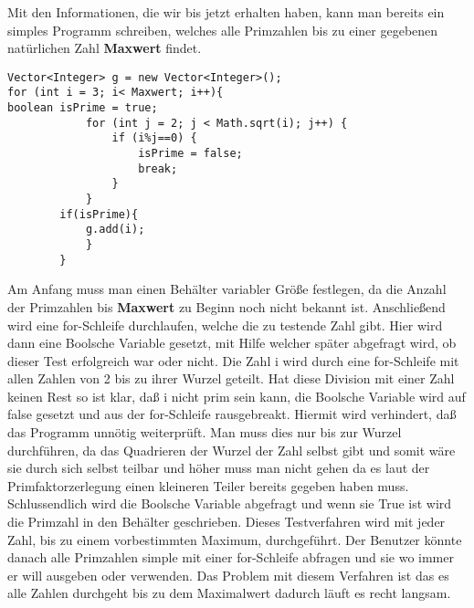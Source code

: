 Mit den Informationen, die wir bis jetzt erhalten haben, kann man bereits ein simples Programm schreiben, welches alle Primzahlen bis zu einer gegebenen natürlichen Zahl \textbf{Maxwert} findet.
\lstset{language=Java} 
\begin{lstlisting}[frame=single] 
Vector<Integer> g = new Vector<Integer>();
for (int i = 3; i< Maxwert; i++){
boolean isPrime = true;
			for (int j = 2; j < Math.sqrt(i); j++) {
				if (i%j==0) {
					isPrime = false;
					break;
				}
			}
		if(isPrime){
			g.add(i);
			}	
		}
\end{lstlisting}
Am Anfang muss man einen Behälter variabler Größe festlegen, da die Anzahl der Primzahlen bis \textbf{Maxwert} zu Beginn noch nicht bekannt ist. Anschließend wird eine for-Schleife durchlaufen, welche die zu testende Zahl gibt. Hier wird dann eine Boolsche Variable gesetzt, mit Hilfe welcher später abgefragt wird, ob dieser Test erfolgreich war oder nicht. Die Zahl i wird durch eine for-Schleife mit allen Zahlen von 2 bis zu ihrer Wurzel geteilt. Hat diese Division mit einer Zahl keinen Rest so ist klar, daß i nicht prim sein kann, die Boolsche Variable wird auf false gesetzt und aus der for-Schleife rausgebreakt. Hiermit wird verhindert, daß das Programm unnötig weiterprüft. Man muss dies nur bis zur Wurzel durchführen, da das Quadrieren der Wurzel der Zahl selbst gibt und somit wäre sie durch sich selbst teilbar und höher muss man nicht gehen da es laut der Primfaktorzerlegung einen kleineren Teiler bereits gegeben haben muss. Schlussendlich wird die Boolsche Variable abgefragt und wenn sie True ist wird die Primzahl in den Behälter geschrieben. Dieses Testverfahren wird mit jeder Zahl, bis zu einem vorbestimmten Maximum, durchgeführt. Der Benutzer könnte danach alle Primzahlen simple mit einer for-Schleife abfragen und sie wo immer er will ausgeben oder verwenden. Das Problem mit diesem Verfahren ist das es alle Zahlen durchgeht bis zu dem Maximalwert dadurch läuft es recht langsam.
